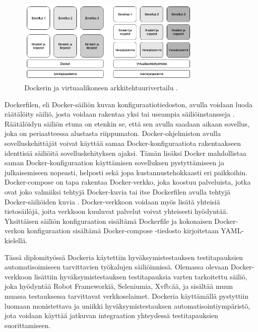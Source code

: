     \begin{figure}[H]
      \centering
      \includegraphics[width=0.8\textwidth]{assets/docker-vs-virtual-machine.png}
      \caption{Dockerin ja virtuaalikoneen arkkitehtuurivertailu \cite{docker_vs_virtual_machine}.}
      \label{fig:docker-vs-virtual-machine}
    \end{figure}

    Dockerfilen, eli Docker-säiliön kuvan konfiguraatiotiedoston, avulla voidaan luoda räätälöity säiliö, josta voidaan rakentaa yksi tai useampia säiliöinstansseja \cite{docker_docs_dockerfile}.
    Räätälöidyn säiliön etuna on etenkin se, että sen avulla saadaan aikaan sovellus, joka on periaatteessa alustasta riippumaton.
    Docker-ohjelmiston avulla sovelluskehittäjät voivat käyttää samaa Docker-konfiguraatiota rakentaakseen identtisiä säiliöitä sovelluskehityksen ajaksi.
    Tämän lisäksi Docker mahdollistaa saman Docker-konfiguraation käyttämisen sovelluksen pystyttämiseen ja julkaisemiseen nopeasti, helposti sekä jopa kustannustehokkaasti eri paikkoihin.
    Docker-compose on tapa rakentaa Docker-verkko, joka koostuu palveluista, jotka ovat joko valmiiksi tehtyjä Docker-kuvia tai itse Dockerfilen avulla tehtyjä Docker-säiliöiden kuvia \cite{docker_docs_compose}.
    Docker-verkkoon voidaan myös lisätä yhteisiä tietosäilöjä, joita verkkoon kuuluvat palvelut voivat yhteisesti hyödyntää.
    Yksittäisen säiliön konfiguraation sisältämä Dockerfile ja kokonaisen Docker-verkon konfiguraation sisältämä Docker-compose -tiedosto kirjoitetaan YAML-kielellä.

    Tässä diplomityössä Dockeria käytettiin hyväksymistestauksen testitapauksien automatisoimiseen tarvittavien työkalujen säiliöinnissä.
    Olemassa olevaan Docker-verkkoon lisättiin hyväksymistestauksen testitapauksia varten tarkoitettu säiliö, joka hyödyntää Robot Frameworkiä, Seleniumia, Xvfb:ää, ja sisältää muun muassa testauksessa tarvittavat verkkoselaimet.
    Dockeria käyttämällä pystyttiin luomaan monistettava ja uniikki hyväksymistestauksen automatisointiympäristö, jota voidaan käyttää jatkuvan integraation yhteydessä testitapauksien suorittamiseen.

